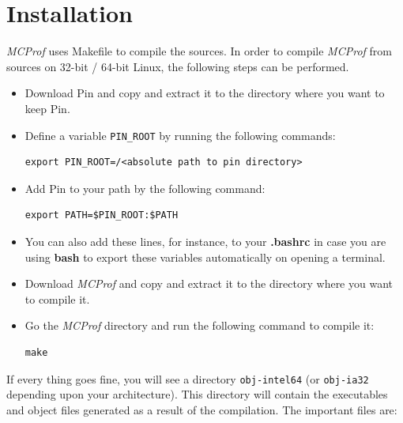\documentclass[10pt]{article}
\newcommand{\MCPROF}{\emph{MCProf}}
\begin{document}
\section{Installation}
\label{sec:installation}

\MCPROF{} uses Makefile to compile the sources. In order to compile \MCPROF{}
from sources on 32-bit / 64-bit Linux, the following steps can be performed.

\begin{itemize}

\item Download Pin and copy and extract it to the directory where you want to
    keep Pin.

\item Define a variable \verb|PIN_ROOT| by running the following commands:

{
\small
\begin{Verbatim}[frame=single]
export PIN_ROOT=/<absolute path to pin directory>
\end{Verbatim}
}

\item Add Pin to your path by the following command:
{
\small
\begin{Verbatim}[frame=single]
export PATH=$PIN_ROOT:$PATH
\end{Verbatim}
}

\item You can also add these lines, for instance, to your \textbf{.bashrc} in case
    you are using \textbf{bash} to export these variables automatically on opening
    a terminal.

\item Download \MCPROF{} and copy and extract it to the directory where you want
    to compile it.

\item Go the \MCPROF{} directory and run the following command to compile it:

{
\small
\begin{Verbatim}[frame=single]
make
\end{Verbatim}
}

\end{itemize}

If every thing goes fine, you will see a directory \verb|obj-intel64| (or
\verb|obj-ia32| depending upon your architecture). This directory will contain
the executables and object files generated as a result of the compilation. The
important files are:
\end{document}
